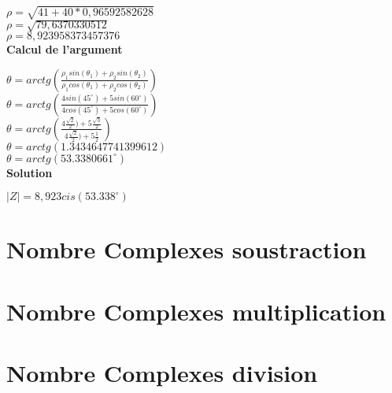 $\rho = \sqrt{41 + 40 * 0,96592582628}$ \\

$\rho = \sqrt{79,6370330512}$ \\

$\rho = 8,923958373457376 $ \\

\vspace{6mm}
\textbf{Calcul de l'argument}
\vspace{5mm}

$\theta = arctg(\frac{\rho_{1}sin(\theta_{1}) + \rho_{2}sin(\theta_{2})} {\rho_{1}cos(\theta_{1}) + \rho_{2}cos(\theta_{2})} )$ \\

$\theta = arctg(\frac{4sin(45^{\circ}) + 5sin(60^{\circ})} {4cos(45^{\circ}) + 5cos(60^{\circ})} )$ \\

$\theta = arctg(\frac{4\frac{\sqrt{2}}{2}) + 5\frac{\sqrt{3}}{2} } {4\frac{\sqrt{2}}{2}) + 5\frac{1}{2}})$ \\

$\theta = arctg(1.3434647741399612)$ \\

$\theta = arctg(53.3380661^{\circ})$ \\

\vspace{6mm}
\textbf{Solution}
\vspace{5mm}

$|Z| = 8,923 cis(53.338^{\circ})$

\newpage
\section{Nombre Complexes soustraction}
\vspace{3mm} %

\newpage
\section{Nombre Complexes multiplication}
\vspace{3mm} %



\newpage
\section{Nombre Complexes division}
\vspace{3mm} %

